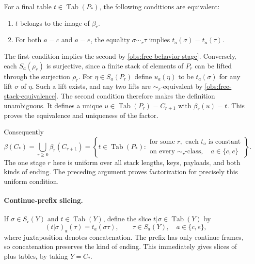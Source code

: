 For a final table $t\in\operatorname{Tab}(P_*)$, the following
conditions are equivalent:
\begin{enumerate}
\item $t$ belongs to the image of $\beta_r$.
\item For both $a=c$ and $a=e$, the equality
      $\sigma\sim_r\tau$ implies $t_a(\sigma)=t_a(\tau)$.
\end{enumerate}
The first condition implies the second by
\eqref{obs:free-behavior-stage}.  Conversely, each
$S_a(\rho_r)$ is surjective, since a finite stack of elements of
$P_r$ can be lifted through the surjection $\rho_r$.  For
$\eta\in S_a(P_r)$ define $u_a(\eta)$ to be $t_a(\sigma)$ for
any lift $\sigma$ of $\eta$.  Such a lift exists, and any two lifts
are $\sim_r$-equivalent by
\eqref{obs:free-stack-equivalence}.  The second condition therefore
makes the definition unambiguous.  It defines a unique
$u\in\operatorname{Tab}(P_r)=C_{r+1}$ with $\beta_r(u)=t$.
This proves the equivalence and uniqueness of the factor.

Consequently
\begin{equation}
  \beta(C_*)
    =\bigcup_{r\geq0}\beta_r(C_{r+1})
    =\left\{
       t\in\operatorname{Tab}(P_*):
       \begin{array}{l}
       \text{for some }r,\text{ each }t_a\text{ is constant}\\
       \text{on every }\sim_r\text{-class},\quad a\in\{c,e\}
       \end{array}
       \right\}.
  \label{obs:free-uniform-factorization}
\end{equation}
The one stage $r$ here is uniform over all stack lengths, keys,
payloads, and both kinds of ending.  The preceding argument proves
factorization for precisely this uniform condition.

\paragraph{Continue-prefix slicing.}
If $\sigma\in S_c(Y)$ and $t\in\operatorname{Tab}(Y)$, define
the slice $t|\sigma\in\operatorname{Tab}(Y)$ by
\begin{equation}
  (t|\sigma)_a(\tau)=t_a(\sigma\tau),
       \qquad \tau\in S_a(Y),\quad a\in\{c,e\},
  \label{obs:free-slice}
\end{equation}
where juxtaposition denotes concatenation.  The prefix has only
continue frames, so concatenation preserves the kind of ending.
This immediately gives slices of plus tables, by taking $Y=C_*$.

